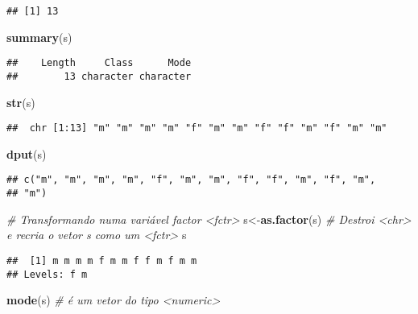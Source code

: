 \documentclass[]{article}
\newenvironment{Shaded}{\begin{snugshade}}{\end{snugshade}}
\newcommand{\KeywordTok}[1]{\textcolor[rgb]{0.13,0.29,0.53}{\textbf{#1}}}
\newcommand{\CommentTok}[1]{\textcolor[rgb]{0.56,0.35,0.01}{\textit{#1}}}
\newcommand{\NormalTok}[1]{#1}
\begin{document}
\begin{verbatim}
## [1] 13
\end{verbatim}

\begin{Shaded}
\begin{Highlighting}[]
\KeywordTok{summary}\NormalTok{(s)}
\end{Highlighting}
\end{Shaded}

\begin{verbatim}
##    Length     Class      Mode 
##        13 character character
\end{verbatim}

\begin{Shaded}
\begin{Highlighting}[]
\KeywordTok{str}\NormalTok{(s)}
\end{Highlighting}
\end{Shaded}

\begin{verbatim}
##  chr [1:13] "m" "m" "m" "m" "f" "m" "m" "f" "f" "m" "f" "m" "m"
\end{verbatim}

\begin{Shaded}
\begin{Highlighting}[]
\KeywordTok{dput}\NormalTok{(s)}
\end{Highlighting}
\end{Shaded}

\begin{verbatim}
## c("m", "m", "m", "m", "f", "m", "m", "f", "f", "m", "f", "m", 
## "m")
\end{verbatim}

\begin{Shaded}
\begin{Highlighting}[]
\CommentTok{# Transformando numa variável factor <fctr>}
\NormalTok{s<-}\KeywordTok{as.factor}\NormalTok{(s) }\CommentTok{# Destroi <chr> e recria o vetor s como um <fctr>}
\NormalTok{s}
\end{Highlighting}
\end{Shaded}

\begin{verbatim}
##  [1] m m m m f m m f f m f m m
## Levels: f m
\end{verbatim}

\begin{Shaded}
\begin{Highlighting}[]
\KeywordTok{mode}\NormalTok{(s) }\CommentTok{# é um vetor do tipo <numeric>}
\end{Highlighting}
\end{Shaded}
\end{document}
